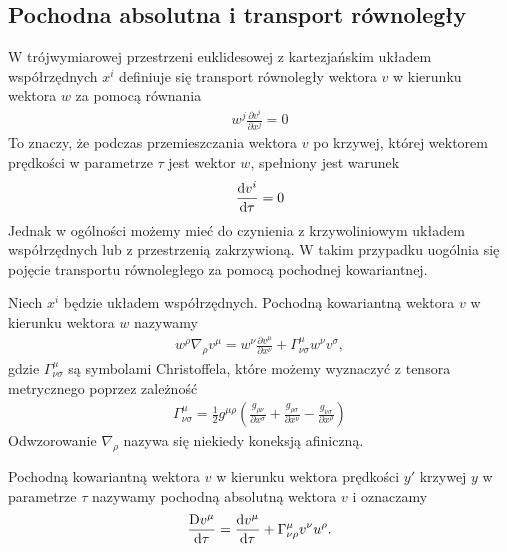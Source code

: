 \subsection{Pochodna absolutna i transport równoległy}
W trójwymiarowej przestrzeni euklidesowej 
z kartezjańskim układem współrzędnych $x^i$ 
definiuje się transport równoległy wektora $v$ w kierunku wektora 
$w$ za pomocą równania 
\begin{align*}
w^j \frac{\partial v^i}{\partial x^j} = 0
\end{align*}
To znaczy, że podczas przemieszczania wektora $v$ po krzywej, której
wektorem prędkości w parametrze $\tau$ jest wektor $w$, spełniony jest 
warunek
\begin{align*}
 \frac{\text{d} v^i}{\text{d} \tau} = 0
\end{align*}
Jednak w ogólności możemy mieć do czynienia z krzywoliniowym układem 
współrzędnych lub z przestrzenią zakrzywioną. W takim przypadku uogólnia
się pojęcie transportu równoległego za pomocą pochodnej kowariantnej.
\begin{definition}
Niech $x^i$ będzie układem współrzędnych. 
Pochodną kowariantną wektora $v$ w kierunku wektora $w$ nazywamy
\begin{align*}
w^\rho \nabla_\rho v^\mu = w^\nu \frac{\partial v^\mu}{\partial x^\nu}
+ \Gamma^\mu_{\nu\sigma} w^\nu v^\sigma ,
\end{align*}
gdzie $\Gamma^\mu_{\nu\sigma} $ są symbolami Christoffela, które możemy
wyznaczyć z tensora metrycznego poprzez zależność
\begin{align*}
\Gamma^\mu_{\nu\sigma} = \frac{1}{2} g^{\mu\rho} 
\left(\frac{g_{\rho\nu}}{\partial x^\sigma}+ 
\frac{g_{\rho\sigma}}{\partial x^\nu}-
\frac{g_{\nu\sigma}}{\partial x^\rho}\right)
\end{align*}
Odwzorowanie $\nabla_\rho$ nazywa się niekiedy koneksją afiniczną.
\end{definition}
\begin{definition}
Pochodną kowariantną wektora $v$ w kierunku wektora prędkości
$y'$ krzywej $y$ w parametrze $\tau$ nazywamy
pochodną absolutną wektora $v$ i oznaczamy 
\begin{align*}
\frac{\text{D} v^\mu }{\text{d} \tau } = \frac{\text{d} v^\mu}{\text{d} \tau}
+ \Gamma^\mu_{\nu\rho} v^\nu u^\rho.
\end{align*}
\end{definition}
